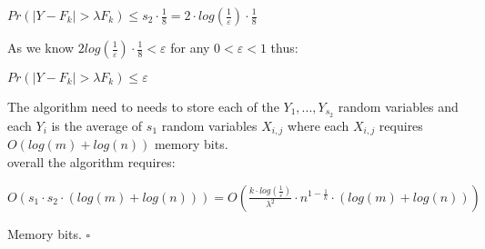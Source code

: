 \documentclass{article}
\begin{document}
\begin{center}
    \(Pr(|Y - F_k| > \lambda F_k) \leq s_2 \cdot \frac{1}{8} = 2\cdot log(\frac{1}{\varepsilon }) \cdot \frac{1}{8}\)
\end{center}
As we know \(2log(\frac{1}{\varepsilon}) \cdot \frac{1}{8} < \varepsilon\) for any \(0 < \varepsilon < 1\) thus:
\begin{center}
    \(Pr(|Y - F_k| > \lambda F_k) \leq \varepsilon\)
\end{center}
The algorithm need to needs to store each of the \(Y_1, ..., Y_{s_2}\) random variables and each \(Y_i\) is the average of \(s_1\) random variables \(X_{i,j}\) where each \(X_{i,j}\) requires \(O(log(m) + log(n))\) memory bits.\\
overall the algorithm requires:
\begin{center}
    \(O(s_1 \cdot s_2 \cdot(log(m) + log(n))) = O(\frac{k\cdot log(\frac{1}{\varepsilon})}{\lambda ^{2}}\cdot n^{1 - \frac{1}{k}}\cdot(log(m) + log(n)))\)
\end{center}
Memory bits.           $\square$
\end{document}
